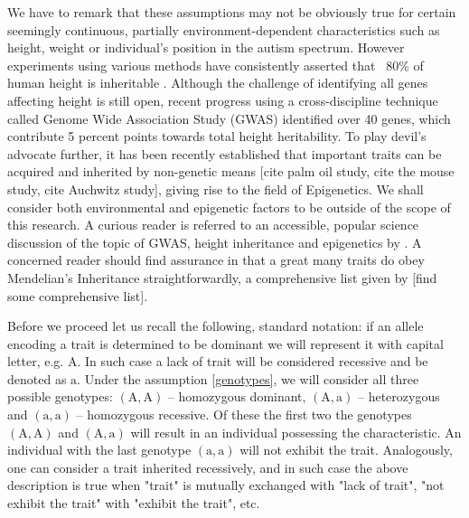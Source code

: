 \documentclass{l4proj}
\newcommand{\genotype}[2]{\ensuremath{(\mathrm{#1}, \mathrm{#2})}}
\begin{document}
We have to remark that these assumptions may not be obviously true for certain seemingly continuous, partially environment-dependent characteristics such as height, weight or individual's position in the autism spectrum. However experiments using various methods have consistently asserted that ~80\% of human height is inheritable \parencite{heightTwins, heightJustSiblings}. Although the challenge of identifying all genes affecting height is still open, recent progress using a cross-discipline technique called Genome Wide Association Study (GWAS) identified over 40 genes, which contribute 5 percent points towards total height heritability. To play devil's advocate further, it has been recently established that important traits can be acquired and inherited by non-genetic means [cite palm oil study, cite the mouse study, cite Auchwitz study], giving rise to the field of Epigenetics. We shall consider both environmental and epigenetic factors to be outside of the scope of this research. A curious reader is referred to an accessible, popular science discussion of the topic of GWAS, height inheritance and epigenetics by \textcite{GWASDiscussion}. A concerned reader should find assurance in that a great many traits do obey Mendelian's Inheritance straightforwardly, a comprehensive list given by [find some comprehensive list].

Before we proceed let us recall the following, standard notation: if an allele encoding a trait is determined to be dominant we will represent it with capital letter, e.g. $\mathrm{A}$. In such case a lack of trait will be considered recessive and be denoted as $\mathrm{a}$. Under the assumption \ref{genotypes}, we will consider all three possible genotypes: \genotype{A}{A} -- homozygous dominant, \genotype{A}{a} -- heterozygous and \genotype{a}{a} -- homozygous recessive. Of these the first two the genotypes \genotype{A}{A} and \genotype{A}{a} will result in an individual possessing the characteristic. An individual with the last genotype \genotype{a}{a} will not exhibit the trait. Analogously, one can consider a trait inherited recessively, and in such case the above description is true when "trait" is mutually exchanged with "lack of trait", "not exhibit the trait" with "exhibit the trait", etc.
\end{document}
